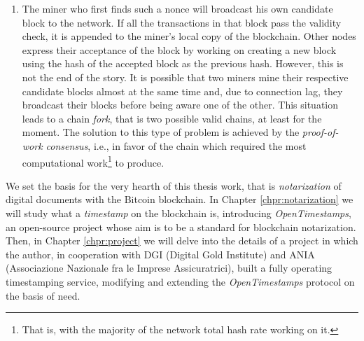 \begin{enumerate}
    \begin{mydef}{\bf (Bitcoin proof-of-work)}.
        \label{def:btc-pow}
        The Bitcoin proof-of-work consists of finding a special number $x$ called nonce s.t. the double SHA256 of the candidate block header falls below a given threshold\textup{\footnote{More precisely, the difficulty $d$ is calculated as: $d=\frac{\text{difficulty\_1\_target}}{\text{current\_target}}$. Traditionally, the \textit{difficulty\_1\_target} represents a hash where the leading 32 bits are zero and the rest are one, known as \textit{pool difficulty}, or \textit{pdiff}. Thus, the threshold value appears as $\frac{2^{224}}{d}$ and not $\frac{2^{256}}{d}$. In addition, the mining threshold is adaptively adjusted every 2016 blocks to achieve an average goal of a block 10 minutes (i.e. every 2 weeks).}}:
        $$F_{d}(c,x) \rightarrow \text{SHA256}(\text{SHA256}(\underbrace{... \| \text{prev\_block\_header\_hash} \| ... \| x}_{\text{Candidate Block Header}})) < \frac{2^{224}}{d}.$$
    \end{mydef}
    
    \item The miner who first finds such a nonce will broadcast his own candidate block to the network. If all the transactions in that block pass the validity check, it is appended to the miner's local copy of the blockchain. Other nodes express their acceptance of the block by working on creating a new block using the hash of the accepted block as the previous hash. However, this is not the end of the story. It is possible that two miners mine their respective candidate blocks almost at the same time and, due to connection lag, they broadcast their blocks before being aware one of the other. This situation leads to a chain \textit{fork}, that is two possible valid chains, at least for the moment. The solution to this type of problem is achieved by the \textit{proof-of-work consensus}, i.e., in favor of the chain which required the most computational work\footnote{That is, with the majority of the network total hash rate working on it.} to produce.

\end{enumerate}

\bigskip
\noindent
We set the basis for the very hearth of this thesis work, that is \textit{notarization} of digital documents with the Bitcoin blockchain. In Chapter \ref{chpr:notarization} we will study what a \textit{timestamp} on the blockchain is, introducing \textit{OpenTimestamps}, an open-source project whose aim is to be a standard for blockchain notarization. Then, in Chapter \ref{chpr:project} we will delve into the details of a project in which the author, in cooperation with DGI (Digital Gold Institute) and ANIA (Associazione Nazionale fra le Imprese Assicuratrici), built a fully operating timestamping service, modifying and extending the \textit{OpenTimestamps} protocol on the basis of need.